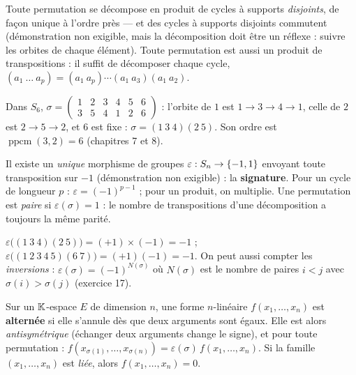 \begin{theoreme}
Toute permutation se décompose en produit de cycles à supports
\emph{disjoints}, de façon unique à l'ordre près — et des cycles à supports
disjoints commutent (démonstration non exigible, mais la décomposition doit
être un réflexe : suivre les orbites de chaque élément). Toute permutation
est aussi un produit de transpositions : il suffit de décomposer chaque
cycle, $(a_1\ \dots\ a_p)=(a_1\ a_p)\cdots(a_1\ a_3)(a_1\ a_2)$.
\end{theoreme}

\begin{exemple}
Dans $S_6$, $\sigma=\begin{pmatrix}1&2&3&4&5&6\\3&5&4&1&2&6\end{pmatrix}$ :
l'orbite de $1$ est $1\to3\to4\to1$, celle de $2$ est $2\to5\to2$, et $6$
est fixe : $\sigma=(1\ 3\ 4)(2\ 5)$. Son ordre est
$\operatorname{ppcm}(3,2)=6$ (chapitres 7 et 8).
\end{exemple}


\begin{theoreme}[Signature]
Il existe un \emph{unique} morphisme de groupes
$\varepsilon:S_n\to\left\{-1,1\right\}$ envoyant toute transposition sur $-1$
(démonstration non exigible) : la \textbf{signature}. Pour un cycle de
longueur $p$ : $\varepsilon=(-1)^{p-1}$ ; pour un produit, on multiplie.
Une permutation est \emph{paire} si $\varepsilon(\sigma)=1$ : le nombre de
transpositions d'une décomposition a toujours la même parité.
\end{theoreme}

\begin{exemple}
$\varepsilon\bigl((1\ 3\ 4)(2\ 5)\bigr)=(+1)\times(-1)=-1$ ;
$\varepsilon\bigl((1\ 2\ 3\ 4\ 5)(6\ 7)\bigr)=(+1)(-1)=-1$. On peut aussi
compter les \emph{inversions} : $\varepsilon(\sigma)=(-1)^{N(\sigma)}$ où
$N(\sigma)$ est le nombre de paires $i<j$ avec $\sigma(i)>\sigma(j)$
(exercice 17).
\end{exemple}


\begin{definition}
Sur un $\mathbb{K}$-espace $E$ de dimension $n$, une forme $n$-linéaire
$f(x_1,\dots,x_n)$ est \textbf{alternée} si elle s'annule dès que deux
arguments sont égaux. Elle est alors \emph{antisymétrique} (échanger deux
arguments change le signe), et pour toute permutation :
$f(x_{\sigma(1)},\dots,x_{\sigma(n)})=\varepsilon(\sigma)\,f(x_1,\dots,x_n)$.
Si la famille $(x_1,\dots,x_n)$ est \emph{liée}, alors
$f(x_1,\dots,x_n)=0$.
\end{definition}

